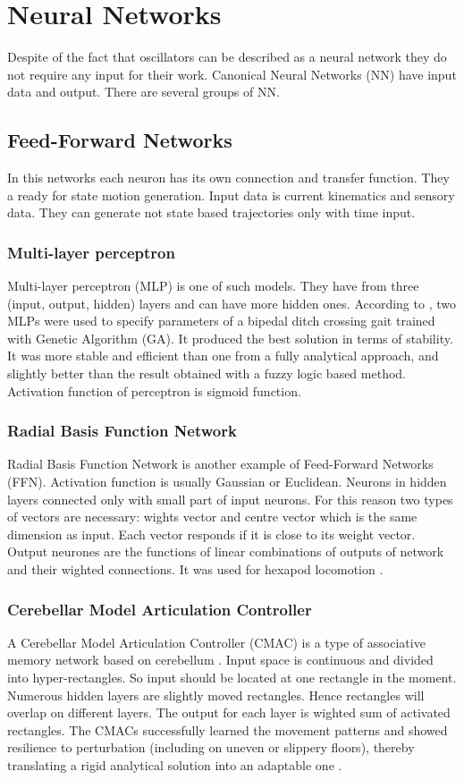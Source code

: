 \documentclass[12pt,a4paper]{report}
\begin{document}
		\section{Neural Networks}
		Despite of the fact that oscillators can be described as a neural network they do not require any input for their work. Canonical Neural Networks (NN) have input data and output. There are several groups of NN.

			\subsection{Feed-Forward Networks}
				In this networks each neuron has its own connection and transfer function. They a ready for state motion generation.  Input data is current kinematics and sensory data. They can generate not state based trajectories only with time input. 
				\subsubsection{Multi-layer perceptron}
					Multi-layer perceptron (MLP) is one of such models. They have from three (input, output, hidden) layers and can have more hidden ones. According to \cite{vundavilli2010dynamically}, two MLPs were used to specify parameters of a bipedal ditch crossing gait trained with Genetic Algorithm (GA). It produced the best solution in terms of stability. It was more stable and efficient than one from a fully analytical approach, and slightly better than the result obtained with a fuzzy logic based method. Activation function of perceptron is sigmoid function.
				\subsubsection{Radial Basis Function Network}
					Radial Basis Function Network is another example of Feed-Forward Networks (FFN). Activation function is usually Gaussian or Euclidean. Neurons in hidden layers connected only with small part of input neurons. For this reason two types of vectors are necessary: wights vector and centre vector which is the same dimension as input. Each vector responds if it is close to its weight vector. Output neurones are the functions of linear combinations of outputs of network and their wighted connections.
					It was used for hexapod locomotion \cite{ilg1995learning}.
				\subsubsection{Cerebellar Model Articulation Controller}
					A Cerebellar Model Articulation Controller (CMAC) is a type of associative memory network based on cerebellum \cite{albus1975new}. Input space is continuous and divided into hyper-rectangles. So input should be located at one rectangle in the moment. Numerous hidden layers are slightly moved rectangles. Hence rectangles will overlap on different layers. The output for each layer is wighted sum of activated rectangles. The CMACs successfully learned the movement patterns and showed resilience to perturbation (including on uneven or slippery floors), thereby translating a rigid analytical solution into an adaptable one \cite{sabourin2005robustness}.
\end{document}
